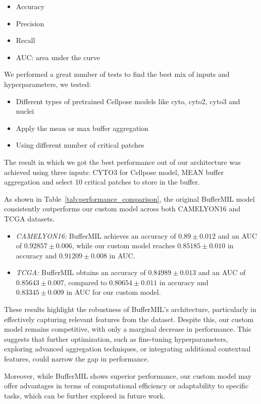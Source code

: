 \documentclass[10pt,twocolumn]{article}
\begin{document}
\begin{itemize}
\item{Accuracy}
\item{Precision}
\item{Recall}
\item{AUC: area under the curve}
\end{itemize}

We performed a great number of tests to find the best mix of inputs and hyperparameters, we tested:

\begin{itemize}
\item{Different types of pretrained Cellpose models like cyto, cyto2, cyto3 and nuclei}
\item{Apply the mean or max buffer aggregation}
\item{Using different number of critical patches}
\end{itemize}

The result in which we got the best performance out of our architecture was achieved using three inputs: CYTO3 for Cellpose model, MEAN buffer aggregation and select 10 critical patches to store in the buffer. 


As shown in Table~\ref{tab:performance_comparison}, the original BufferMIL model consistently outperforms our custom model across both CAMELYON16 and TCGA datasets. 

\begin{itemize}
\item\textit{CAMELYON16:} BufferMIL achieves an accuracy of $0.89 \pm 0.012$ and an AUC of $0.92857 \pm 0.006$, while our custom model reaches $0.85185 \pm 0.010$ in accuracy and $0.91209 \pm 0.008$ in AUC.  
\item\textit{TCGA:} BufferMIL obtains an accuracy of $0.84989 \pm 0.013$ and an AUC of $0.85643 \pm 0.007$, compared to $0.80654 \pm 0.011$ in accuracy and $0.83345 \pm 0.009$ in AUC for our custom model.
\end{itemize}

These results highlight the robustness of BufferMIL’s architecture, particularly in effectively capturing relevant features from the dataset. Despite this, our custom model remains competitive, with only a marginal decrease in performance. This suggests that further optimization, such as fine-tuning hyperparameters, exploring advanced aggregation techniques, or integrating additional contextual features, could narrow the gap in performance.

Moreover, while BufferMIL shows superior performance, our custom model may offer advantages in terms of computational efficiency or adaptability to specific tasks, which can be further explored in future work.
\end{document}
